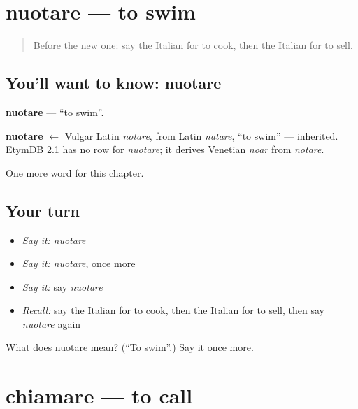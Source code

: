 \section[nuotare]{nuotare — to swim}

\label{lesson:IT-C48-nuotare}



\begin{quote}
Before the new one: say the Italian for to cook, then the Italian for to sell.
\end{quote}

\subsection*{You'll want to know: nuotare}
\textbf{nuotare} — \textquotedblleft{}to swim\textquotedblright{}.

\begin{cousinweb}
\textbf{nuotare} $\leftarrow$ Vulgar Latin \emph{notare}, from Latin \emph{natare}, \textquotedblleft{}to swim\textquotedblright{} — inherited. EtymDB 2.1 has no row for \emph{nuotare}; it derives Venetian \emph{noar} from \emph{notare}.
\end{cousinweb}

\begin{grammarlens}[title={What you've built}]
One more word for this chapter.
\end{grammarlens}

\subsection*{Your turn}
\begin{itemize}
\raggedright
  \item \emph{Say it:} \emph{nuotare}
  \item \emph{Say it:} \emph{nuotare}, once more
  \item \emph{Say it:} say \emph{nuotare}
  \item \emph{Recall:} say the Italian for to cook, then the Italian for to sell, then say \emph{nuotare} again
\end{itemize}

\begin{tcolorbox}[breakable,colback=teal!4,colframe=teal!35!black,title={Before you move on}]
What does nuotare mean? (\textquotedblleft{}To swim\textquotedblright{}.) Say it once more.
\end{tcolorbox}
\section[chiamare]{chiamare — to call}

